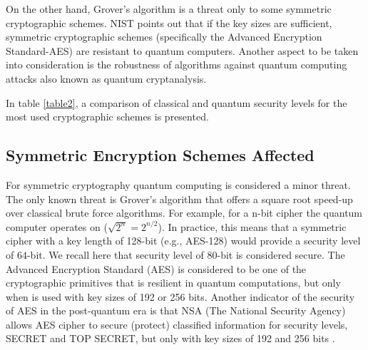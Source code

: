 \documentclass[conference, letterpaper]{IEEEtran}
\begin{document}
On the other hand, Grover’s algorithm is a threat only to some symmetric cryptographic schemes. NIST \cite{Chen2016} points out that if the key sizes are sufficient, symmetric cryptographic schemes (specifically the Advanced Encryption Standard-AES) are resistant to quantum computers. Another aspect to be taken into consideration is the robustness of algorithms against quantum computing attacks also known as quantum cryptanalysis. 

In table \ref{table2}, a comparison of classical and quantum security levels for the most used cryptographic schemes is presented.


\subsection{Symmetric Encryption Schemes Affected}
For symmetric cryptography quantum computing is considered a minor threat. The only known threat is Grover's algorithm that offers a square root speed-up over classical brute force algorithms. For example, for a n-bit cipher the quantum computer operates on ($\sqrt{2^{n}} = 2^{n/2}$). In practice, this means that a symmetric cipher with a key length of 128-bit (e.g., AES-128) would provide a security level of 64-bit. 
We recall here that security level of 80-bit is considered secure. The Advanced Encryption Standard (AES) is considered to be one of the cryptographic primitives that is resilient in quantum computations, but only when is used with key sizes of 192 or 256 bits. Another indicator of the security of AES in the post-quantum era is that NSA (The National Security Agency) allows AES cipher to secure (protect) classified information for security levels, SECRET and TOP SECRET, but only with key sizes of 192 and 256 bits \cite{NationalSecurityAgency2003}.
\end{document}
